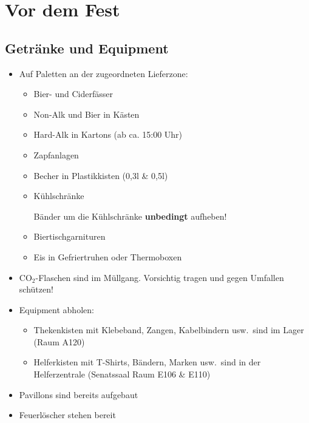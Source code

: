 \section{Vor dem Fest}
\subsection{Getränke und Equipment}
\begin{itemize}
  \item Auf Paletten an der zugeordneten Lieferzone:
    \begin{itemize}
      \item Bier- und Ciderfässer
      \item Non-Alk und Bier in Kästen
      \item Hard-Alk in Kartons (ab ca. 15:00 Uhr)
      \item Zapfanlagen
      \item Becher in Plastikkisten (0,3l \& 0,5l)
      \item Kühlschränke

        Bänder um die Kühlschränke \textbf{unbedingt} aufheben!
      \item Biertischgarnituren
      \item Eis in Gefriertruhen oder Thermoboxen
    \end{itemize}
  \item CO$_2$-Flaschen sind im Müllgang. Vorsichtig tragen und gegen Umfallen schützen!
  \item Equipment abholen:
    \begin{itemize}
      \item Thekenkisten mit Klebeband, Zangen, Kabelbindern usw.\ sind im Lager (Raum A120) %
      \item Helferkisten mit T-Shirts, Bändern, Marken usw.\ sind in der Helferzentrale (Senatssaal Raum E106 \& E110)
    \end{itemize}
  \item Pavillons sind bereits aufgebaut
  \item Feuerlöscher stehen bereit
\end{itemize}
